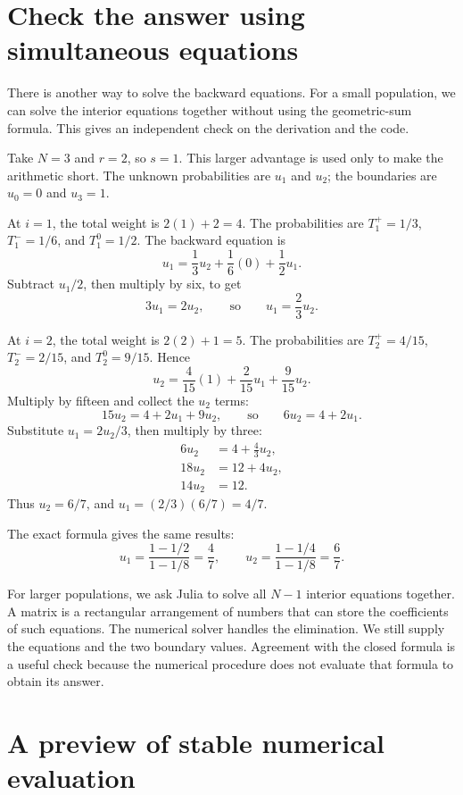 \section{Check the answer using simultaneous equations}

There is another way to solve the backward equations. For a small population,
we can solve the interior equations together without using the geometric-sum
formula. This gives an independent check on the derivation and the code.

Take \(N=3\) and \(r=2\), so \(s=1\). This larger advantage is used
only to make the arithmetic short. The unknown probabilities are \(u_1\)
and \(u_2\); the boundaries are \(u_0=0\) and \(u_3=1\).

At \(i=1\), the total weight is \(2(1)+2=4\). The probabilities are
\(T_1^+=1/3\), \(T_1^-=1/6\), and \(T_1^0=1/2\). The backward
equation is
\[
 u_1=\frac13u_2+\frac16(0)+\frac12u_1.
\]
Subtract \(u_1/2\), then multiply by six, to get
\[
 3u_1=2u_2,\qquad\text{so}\qquad u_1=\frac23u_2.
\]

At \(i=2\), the total weight is \(2(2)+1=5\). The probabilities are
\(T_2^+=4/15\), \(T_2^-=2/15\), and \(T_2^0=9/15\). Hence
\[
 u_2=\frac4{15}(1)+\frac2{15}u_1+\frac9{15}u_2.
\]
Multiply by fifteen and collect the \(u_2\) terms:
\[
 15u_2=4+2u_1+9u_2,\qquad\text{so}\qquad6u_2=4+2u_1.
\]
Substitute \(u_1=2u_2/3\), then multiply by three:
\begin{align*}
 6u_2&=4+\frac43u_2,\\
 18u_2&=12+4u_2,\\
 14u_2&=12.
\end{align*}
Thus \(u_2=6/7\), and \(u_1=(2/3)(6/7)=4/7\).

The exact formula gives the same results:
\[
 u_1=\frac{1-1/2}{1-1/8}=\frac47,\qquad
 u_2=\frac{1-1/4}{1-1/8}=\frac67.
\]

For larger populations, we ask Julia to solve all \(N-1\) interior
equations together. A matrix is a rectangular arrangement of numbers that
can store the coefficients of such equations. The numerical solver handles
the elimination. We still supply the equations and the two boundary values.
Agreement with the closed formula is a useful check because the numerical
procedure does not evaluate that formula to obtain its answer.

\section{A preview of stable numerical evaluation}

